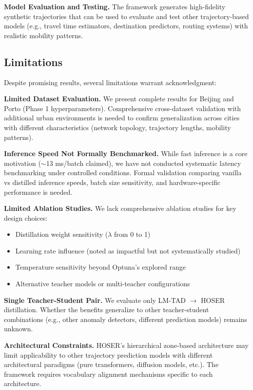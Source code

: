 \textbf{Model Evaluation and Testing.} The framework generates high-fidelity synthetic trajectories that can be used to evaluate and test other trajectory-based models (e.g., travel time estimators, destination predictors, routing systems) with realistic mobility patterns.

\subsection{Limitations}
\label{sec:conclusion-limitations}

Despite promising results, several limitations warrant acknowledgment:

\textbf{Limited Dataset Evaluation.} We present complete results for Beijing and Porto (Phase 1 hyperparameters). Comprehensive cross-dataset validation with additional urban environments is needed to confirm generalization across cities with different characteristics (network topology, trajectory lengths, mobility patterns).

\textbf{Inference Speed Not Formally Benchmarked.} While fast inference is a core motivation ($\sim$13 ms/batch claimed), we have not conducted systematic latency benchmarking under controlled conditions. Formal validation comparing vanilla vs distilled inference speeds, batch size sensitivity, and hardware-specific performance is needed.

\textbf{Limited Ablation Studies.} We lack comprehensive ablation studies for key design choices:
\begin{itemize}[noitemsep,topsep=0pt]
    \item Distillation weight sensitivity ($\lambda$ from 0 to 1)
    \item Learning rate influence (noted as impactful but not systematically studied)
    \item Temperature sensitivity beyond Optuna's explored range
    \item Alternative teacher models or multi-teacher configurations
\end{itemize}

\textbf{Single Teacher-Student Pair.} We evaluate only LM-TAD $\rightarrow$ HOSER distillation. Whether the benefits generalize to other teacher-student combinations (e.g., other anomaly detectors, different prediction models) remains unknown.

\textbf{Architectural Constraints.} HOSER's hierarchical zone-based architecture may limit applicability to other trajectory prediction models with different architectural paradigms (pure transformers, diffusion models, etc.). The framework requires vocabulary alignment mechanisms specific to each architecture.

